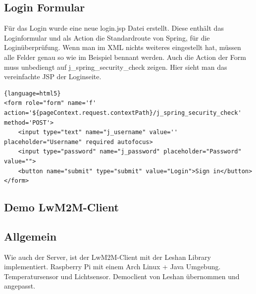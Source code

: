 \subsection{Login Formular}
Für das Login wurde eine neue login.jsp Datei erstellt. Diese enthält das Loginformular und als Action die Standardroute von Spring, für die Loginüberprüfung. Wenn man im XML nichts weiteres eingestellt hat, müssen alle Felder genau so wie im Beispiel bennant werden. Auch die Action der Form muss unbediengt auf j\_spring\_security\_check zeigen. Hier sieht man das vereinfachte JSP der Loginseite.
\begin{lstlisting}{language=html5}
<form role="form" name='f' action='${pageContext.request.contextPath}/j_spring_security_check' method='POST'>
	<input type="text" name="j_username" value='' placeholder="Username" required autofocus>
	<input type="password" name="j_password" placeholder="Password" value="">
	<button name="submit" type="submit" value="Login">Sign in</button>
</form>
\end{lstlisting}


\newpage

\subsection{Demo LwM2M-Client}
\subsection{Allgemein}
Wie auch der Server, ist der LwM2M-Client mit der Leshan Library implementiert. 
Raspberry Pi mit einem Arch Linux + Java Umgebung.
Temperatursensor und Lichtsensor.
Democlient von Leshan übernommen und angepasst.